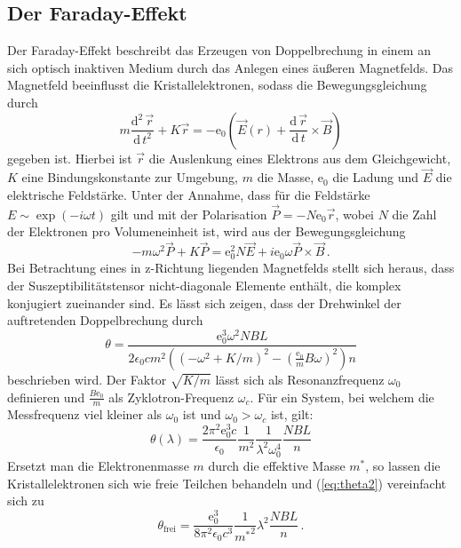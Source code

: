 \subsection{Der Faraday-Effekt}
Der Faraday-Effekt beschreibt das Erzeugen von Doppelbrechung in einem an sich optisch inaktiven Medium durch das Anlegen eines äußeren Magnetfelds. Das Magnetfeld beeinflusst die Kristallelektronen, sodass die Bewegungsgleichung durch
\begin{equation}
  m\frac{\text{d}^2\,\vec{r}}{\text{d}\,t^2}+K\vec{r}=-\text{e}_0\left(\vec{E}(r)+\frac{\text{d}\,\vec{r}}{\text{d}\,t}\times\vec{B}\right)
\end{equation}
gegeben ist. Hierbei ist $\vec{r}$ die Auslenkung eines Elektrons aus dem Gleichgewicht, $K$ eine Bindungskonstante zur Umgebung, $m$ die Masse, e$_0$ die Ladung und $\vec{E}$ die elektrische Feldstärke.
Unter der Annahme, dass für die Feldstärke $E\sim\exp(-i\omega t)$ gilt und mit der Polarisation $\vec{P}=-N\text{e}_0\vec{r}$, wobei $N$ die Zahl der Elektronen pro Volumeneinheit ist, wird aus der Bewegungsgleichung
\begin{equation}
-m\omega^2\vec{P}+K\vec{P}=\text{e}_0^2N\vec{E}+i\text{e}_0\omega\vec{P}\times\vec{B}\,.
\end{equation}
Bei Betrachtung eines in z-Richtung liegenden Magnetfelds stellt sich heraus, dass der Suszeptibilitätstensor nicht-diagonale Elemente enthält, die komplex konjugiert zueinander sind.
Es lässt sich zeigen, dass der Drehwinkel der auftretenden Doppelbrechung durch
\begin{equation}
\theta=\frac{\text{e}_0^3\omega^2NBL}{2\epsilon_0cm^2\left(\left(-\omega^2+K/m\right)^2-\left(\frac{\text{e}_0}{m}B\omega\right)^2\right)n}
\end{equation}
beschrieben wird. Der Faktor $\sqrt{K/m}$ lässt sich als Resonanzfrequenz $\omega_0$ definieren und $\frac{B\text{e}_0}{m}$ als Zyklotron-Frequenz $\omega_c$. Für ein System, bei welchem die Messfrequenz viel kleiner als $\omega_0$ ist und $\omega_0>\omega_c$ ist, gilt:
\begin{equation}
\theta(\lambda)=\frac{2\pi^2\text{e}_0^3c}{\epsilon_0}\frac{1}{m^2}\frac{1}{\lambda^2\omega_0^4}\frac{NBL}{n}
\label{eq:theta2}
\end{equation}
Ersetzt man die Elektronenmasse $m$ durch die effektive Masse $m^*$, so lassen die Kristallelektronen sich wie freie Teilchen behandeln und (\ref{eq:theta2}) vereinfacht sich zu
\begin{equation}
\theta_\text{frei}=\frac{\text{e}_0^3}{8\pi^2\epsilon_0c^3}\frac{1}{{m^*}^2}\lambda^2\frac{NBL}{n}\,.
\end{equation}
